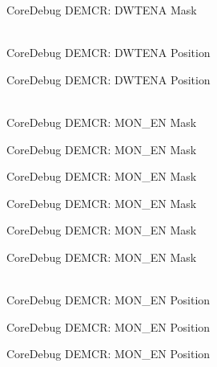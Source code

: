 \begin{DoxyRefList}
\label{deprecated__deprecated000273}%
%
Core\+Debug DEMCR:\+ DWTENA Mask  
\item[{\parbox[t]{\linewidth}{Global \doxylink{group__CMSIS__CoreDebug_ga0cde79c4e741e1eed0513c1f985baeb9}{Core\+Debug\+\_\+\+DEMCR\+\_\+\+DWTENA\+\_\+\+Pos} }}]\hfill \\
\label{deprecated__deprecated000133}%
%
Core\+Debug DEMCR:\+ DWTENA Position 

\label{deprecated__deprecated000272}%
%
Core\+Debug DEMCR:\+ DWTENA Position  
\item[{\parbox[t]{\linewidth}{Global \doxylink{group__CMSIS__CoreDebug_gac2b46b9b65bf8d23027f255fc9641977}{Core\+Debug\+\_\+\+DEMCR\+\_\+\+MON\+\_\+\+EN\+\_\+\+Msk} }}]\hfill \\
\label{deprecated__deprecated000054}%
%
Core\+Debug DEMCR:\+ MON\+\_\+\+EN Mask 

\label{deprecated__deprecated000198}%
%
Core\+Debug DEMCR:\+ MON\+\_\+\+EN Mask 

\label{deprecated__deprecated000340}%
%
Core\+Debug DEMCR:\+ MON\+\_\+\+EN Mask 

\label{deprecated__deprecated000416}%
%
Core\+Debug DEMCR:\+ MON\+\_\+\+EN Mask 

\label{deprecated__deprecated000505}%
%
Core\+Debug DEMCR:\+ MON\+\_\+\+EN Mask 

\label{deprecated__deprecated000607}%
%
Core\+Debug DEMCR:\+ MON\+\_\+\+EN Mask  
\item[{\parbox[t]{\linewidth}{Global \doxylink{group__CMSIS__CoreDebug_ga802829678f6871863ae9ecf60a10425c}{Core\+Debug\+\_\+\+DEMCR\+\_\+\+MON\+\_\+\+EN\+\_\+\+Pos} }}]\hfill \\
\label{deprecated__deprecated000053}%
%
Core\+Debug DEMCR:\+ MON\+\_\+\+EN Position 

\label{deprecated__deprecated000197}%
%
Core\+Debug DEMCR:\+ MON\+\_\+\+EN Position 

\label{deprecated__deprecated000339}%
%
Core\+Debug DEMCR:\+ MON\+\_\+\+EN Position 


\end{DoxyRefList}
